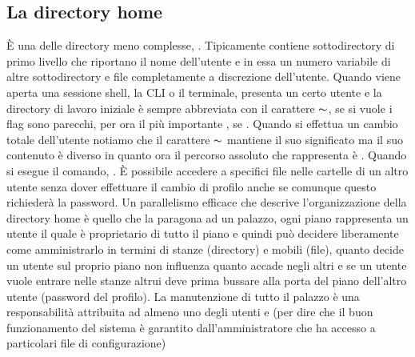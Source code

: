 \subsection{La directory home}
\label{subsec:La-directory-home}
È una delle directory meno complesse, . Tipicamente contiene sottodirectory di primo livello che riportano il nome dell'utente e in essa un numero variabile di altre sottodirectory e file completamente a discrezione dell'utente. Quando viene aperta una sessione shell, la CLI o il terminale, presenta un certo utente e la directory di lavoro iniziale è sempre  abbreviata con il carattere $\thicksim$, se si vuole  i flag sono parecchi, per ora il più importante , se . Quando si effettua un cambio totale dell'utente notiamo che il carattere $\thicksim$ mantiene il suo significato ma il suo contenuto è diverso in quanto ora il percorso assoluto che rappresenta è . Quando si esegue il comando, . È possibile accedere a specifici file nelle cartelle di un altro utente senza dover effettuare il cambio di profilo anche se comunque questo richiederà la password. 
Un parallelismo efficace che descrive l'organizzazione della directory home è quello che la paragona ad un palazzo, ogni piano rappresenta un utente il quale è proprietario di tutto il piano e quindi può decidere liberamente come amministrarlo in termini di stanze (directory) e mobili (file), quanto decide un utente sul proprio piano non influenza quanto accade negli altri e se un utente vuole entrare nelle stanze altrui deve prima bussare alla porta del piano dell'altro utente (password del profilo). La manutenzione di tutto il palazzo è una responsabilità attribuita ad almeno uno degli utenti e (per dire che il buon funzionamento del sistema è garantito dall'amministratore che ha accesso a particolari file di configurazione)

